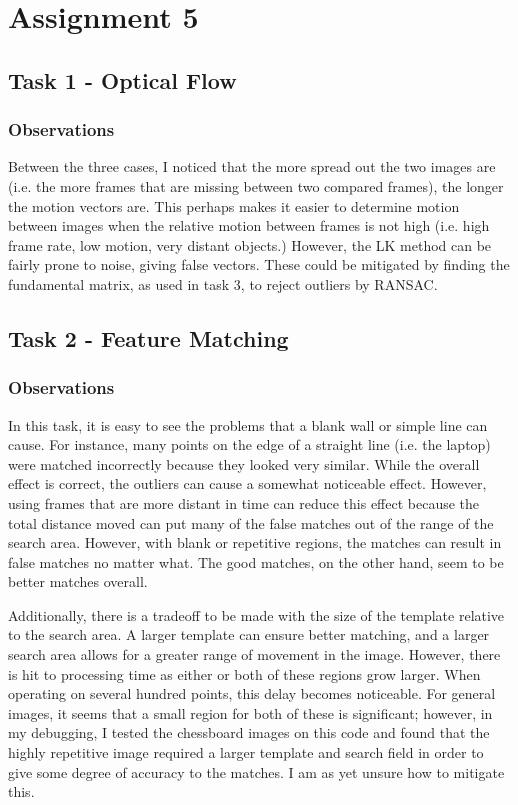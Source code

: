 \documentclass[11pt,a4paper]{report}
\begin{document}
\chapter*{Assignment 5}
\section*{Task 1 - Optical Flow}

\subsection*{Observations}
Between the three cases, I noticed that the more spread out the two images are (i.e. the more frames that are missing between two compared frames), the longer the motion vectors are. This perhaps makes it easier to determine motion between images when the relative motion between frames is not high (i.e. high frame rate, low motion, very distant objects.) However, the LK method can be fairly prone to noise, giving false vectors. These could be mitigated by finding the fundamental matrix, as used in task 3, to reject outliers by RANSAC. 

\section*{Task 2 - Feature Matching}

\subsection*{Observations}

In this task, it is easy to see the problems that a blank wall or simple line can cause. For instance, many points on the edge of a straight line (i.e. the laptop) were matched incorrectly because they looked very similar. While the overall effect is correct, the outliers can cause a somewhat noticeable effect. However, using frames that are more distant in time can reduce this effect because the total distance moved can put many of the false matches out of the range of the search area. However, with blank or repetitive regions, the matches can result in false matches no matter what. The good matches, on the other hand, seem to be better matches overall.

Additionally, there is a tradeoff to be made with the size of the template relative to the search area. A larger template can ensure better matching, and a larger search area allows for a greater range of movement in the image. However, there is hit to processing time as either or both of these regions grow larger. When operating on several hundred points, this delay becomes noticeable. For general images, it seems that a small region for both of these is significant; however, in my debugging, I tested the chessboard images on this code and found that the highly repetitive image required a larger template and search field in order to give some degree of accuracy to the matches. I am as yet unsure how to mitigate this. 
\end{document}
